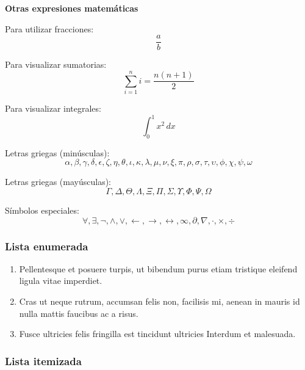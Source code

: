 \documentclass[12pt, a4paper]{article}
\begin{document}
\textbf{ Otras expresiones matemáticas }

Para utilizar fracciones: \\
\[
\frac{a}{b}
\]

Para visualizar sumatorias: \\

\[
\sum_{i=1}^{n} i = \frac{n(n+1)}{2}
\]

Para visualizar integrales: \\

\[
\int_{0}^{1} x^2 \, dx
\]

Letras griegas (minúsculas): \\
\[
\alpha, \beta, \gamma, \delta, \epsilon, \zeta, \eta, \theta, \iota, \kappa, \lambda, \mu, \nu, \xi, \pi, \rho, \sigma, \tau, \upsilon, \phi, \chi, \psi, \omega
\]

Letras griegas (mayúsculas): \\

\[
\Gamma, \Delta, \Theta, \Lambda, \Xi, \Pi, \Sigma, \Upsilon, \Phi, \Psi, \Omega
\]

Símbolos especiales: \\

\[
\forall, \exists, \neg, \wedge, \vee, \leftarrow, \rightarrow, \leftrightarrow, \infty, \partial, \nabla, \cdot, \times, \div
\]

\subsubsection{Lista enumerada} 

\begin{enumerate}

    \item Pellentesque et posuere turpis, ut bibendum purus etiam tristique eleifend ligula vitae imperdiet.

    \item Cras ut neque rutrum, accumsan felis non, facilisis mi, aenean in mauris id nulla mattis faucibus ac a risus. 

    \item Fusce ultricies felis fringilla est tincidunt ultricies Interdum et malesuada. 

\end{enumerate} 


\subsubsection{Lista itemizada} 
\end{document}
